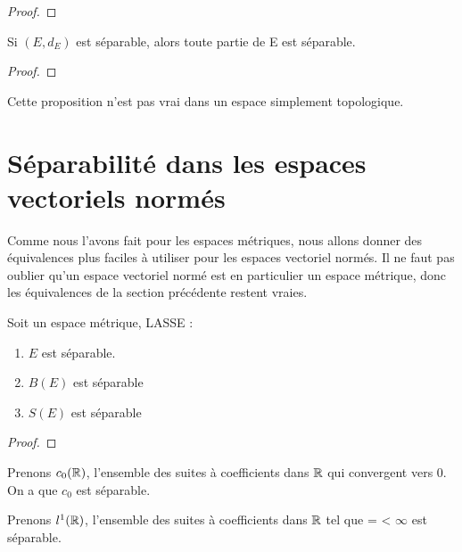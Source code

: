 \begin{proof}
	
\end{proof}

\begin{proposition}
	Si $(E, d_{E})$ est séparable, alors toute partie de E est séparable.
\end{proposition}

\begin{proof}
	
\end{proof}

\begin{remarque}
	Cette proposition n'est pas vrai dans un espace simplement topologique.
\end{remarque}

\section{Séparabilité dans les espaces vectoriels normés}

Comme nous l'avons fait pour les espaces métriques, nous allons donner des
équivalences plus faciles à utiliser pour les espaces vectoriel normés. Il ne
faut pas oublier qu'un espace vectoriel normé est en particulier un espace
métrique, donc les équivalences de la section précédente restent vraies.

\begin{proposition}
	Soit  un espace métrique, LASSE :
	\begin{enumerate}
		\item $E$ est séparable.
		\item $B(E)$ est séparable
		\item $S(E)$ est séparable
	\end{enumerate}
\end{proposition}

\begin{proof}
	
\end{proof}

\begin{exemple}
	Prenons $c_{0}(\mathbb{R})$, l'ensemble des suites à coefficients dans $\mathbb{R}$
	qui convergent vers 0. On a que $c_{0}$ est séparable.
\end{exemple}

\begin{exemple}
	Prenons $l^{1}(\mathbb{R})$, l'ensemble des suites à coefficients dans $\mathbb{R}$
	tel que  =  < $\infty$ est
	séparable.
\end{exemple}

